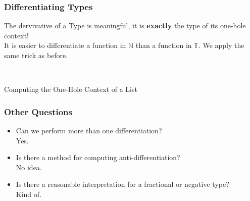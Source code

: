 \documentclass[10pt]{beamer}
\begin{document}
\begin{frame}[fragile]
    \frametitle{Differentiating Types}
    The dervivative of a Type is meaningful, it is \textbf{exactly} the type of its one-hole context! \\

    It is easier to differentiate a function in $\mathbb{N}$ than a function in $\mathbb{T}$. We apply the same trick as before.

    \begin{center}
    \end{center} \\

    

\end{frame}


\begin{frame}[standout]
  Computing the One-Hole Context of a List
\end{frame}



\begin{frame}[fragile]
    \frametitle{Other Questions}
    \begin{itemize}
        \item Can we perform more than one differentiation? \\
            Yes.
        \item Is there a method for computing anti-differentiation? \\
            No idea.
        \item Is there a reasonable interpretation for a fractional or negative type? \\
            Kind of.
    \end{itemize} 

\end{frame}
\end{document}
